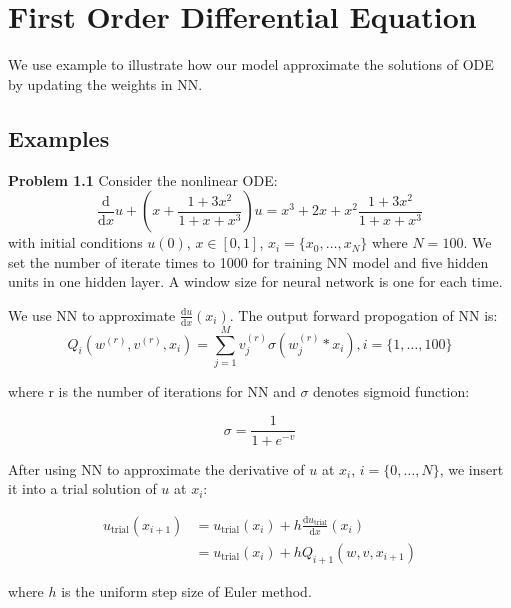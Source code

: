 \documentclass{article}
\begin{document}
	\section{First Order Differential Equation}
	We use example to illustrate how our model approximate the solutions of ODE by updating the weights in NN. 
		\subsection{Examples}
	
		\textbf{Problem 1.1} Consider the nonlinear ODE: 
	\[\frac{\mathrm{d}}{\mathrm{d}x}u + \left(x+\frac{1+3x^2}{1+x+x^3}\right)u = x^3 +2x +x^{2}\frac{1+3x^2}{1+x+x^3}\]
	with initial conditions $u(0)$, $x \in [0,1]$, $x_i=\{x_0, \dots, x_N\}$ where $N=100$. We set the number of iterate times to 1000 for training NN model and five hidden units in one hidden layer. A window size for neural network is one for each time.
	
	\par
	We use NN to approximate $\frac{\mathrm{d}u}{\mathrm{d}x}(x_i)$. The output forward propogation of NN is:
	\begin{equation}\label{eq:output_ode}
	Q_i (w^{(r)},v^{(r)},x_i)=  \sum_{j=1}^{M}  v_{j}^{(r)}\sigma (w_{j}^{(r)}*x_i), i = \{1, \dots, 100\}
	\end{equation}
	
		\medspace \noindent
	where r is the number of iterations for NN and $\sigma$ denotes sigmoid function:
	
	\[\sigma = \frac{1}{1+e^{-\textit{v}}}\]
	
	After using NN to approximate the derivative of $u$ at $x_i$, $i=\{0, \dots, N\}$, we insert it into a trial solution of $u$ at $x_i$:  
	
	\begin{equation}
	\begin{aligned}
	u_{\text{trial}}(x_{i+1}) &= u_{\text{trial}}(x_{i}) +h\frac{\mathrm{d}u_{\text{trial}}}{\mathrm{d}x}(x_i) \\
							  &=  u_{\text{trial}}(x_{i}) +hQ_{i+1}(w,v,x_{i+1})
	\end{aligned}
	\label{eq:trial_example1}
	\end{equation}
	
	\medspace \noindent
	where $h$ is the uniform step size of Euler method.  
	
\end{document}
